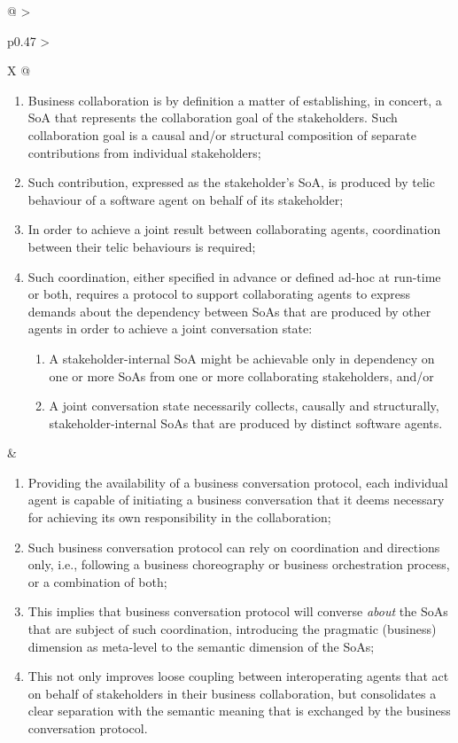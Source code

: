 \begin{xltabular}[l]{\linewidth}{@{} >{\small\raggedright\arraybackslash}p{0.47\linewidth} >{\small\raggedright\arraybackslash}X @{}}
\begin{enumerate}[left=6pt, nosep]
  \item Business collaboration is by definition a matter of establishing, in concert, a SoA that represents the collaboration goal of the stakeholders. Such collaboration goal is a causal and/or structural composition of separate contributions from individual stakeholders;
  \item Such contribution, expressed as the stakeholder's SoA, is produced by telic behaviour of a software agent on behalf of its stakeholder;
  \item In order to achieve a joint result between collaborating agents, coordination between their telic behaviours is required;
  \item Such coordination, either specified in advance or defined ad-hoc at run-time or both, requires a protocol to support collaborating agents to express demands about the dependency between SoAs that are produced by other agents in order to achieve a joint conversation state:
  \begin{enumerate}
    \item A stakeholder-internal SoA might be achievable only in dependency on one or more SoAs from one or more collaborating stakeholders, and/or
    \item A joint conversation state necessarily collects, causally and structurally, stakeholder-internal SoAs that are produced by distinct software agents.
  \end{enumerate}
\end{enumerate}
&
\begin{enumerate}[left=10pt, nosep]
  \item Providing the availability of a business conversation protocol, each individual agent is capable of initiating a business conversation that it deems necessary for achieving its own responsibility in the collaboration;
  \item Such business conversation protocol can rely on coordination and directions only, i.e., following a business choreography or business orchestration process, or a combination of both;
  \item This implies that business conversation protocol will converse \emph{about} the SoAs that are subject of such coordination, introducing the pragmatic (business) dimension as meta-level to the semantic dimension of the SoAs;
  \item This not only improves loose coupling between interoperating agents that act on behalf of stakeholders in their business collaboration, but consolidates a clear separation with the semantic meaning that is exchanged by the business conversation protocol.

\end{enumerate}
\end{xltabular}
